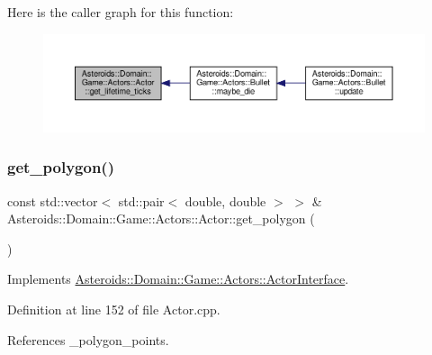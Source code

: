 Here is the caller graph for this function\+:\nopagebreak
\begin{figure}[H]
\begin{center}
\leavevmode
\includegraphics[width=350pt]{classAsteroids_1_1Domain_1_1Game_1_1Actors_1_1Actor_a4e096daf30dca67bcd500fcae7e80979_icgraph}
\end{center}
\end{figure}
\mbox{\label{classAsteroids_1_1Domain_1_1Game_1_1Actors_1_1Actor_a8c78eaf91bff447a07b24708478ed0d8}} 
\subsubsection{\texorpdfstring{get\+\_\+polygon()}{get\_polygon()}}
{\footnotesize\ttfamily const std\+::vector$<$ std\+::pair$<$ double, double $>$ $>$ \& Asteroids\+::\+Domain\+::\+Game\+::\+Actors\+::\+Actor\+::get\+\_\+polygon (\begin{DoxyParamCaption}{ }\end{DoxyParamCaption})\hspace{0.3cm}{\ttfamily [virtual]}}



Implements \hyperlink{classAsteroids_1_1Domain_1_1Game_1_1Actors_1_1ActorInterface_a93f09dfff17f0addd37d216d123ed797}{Asteroids\+::\+Domain\+::\+Game\+::\+Actors\+::\+Actor\+Interface}.



Definition at line 152 of file Actor.\+cpp.



References \+\_\+polygon\+\_\+points.

\mbox{\label{classAsteroids_1_1Domain_1_1Game_1_1Actors_1_1Actor_ae22e20b86f0f95b334cc64d5a9b14c99}} 

